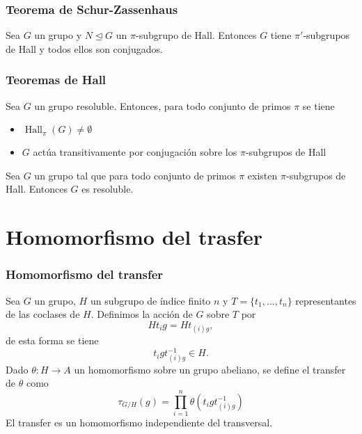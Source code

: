 \documentclass[
	11pt, %
]{beamer}
\DeclareMathOperator{\SylowSubgroup}{Syl}
\DeclareMathOperator{\HallSubgroup}{Hall}
\newcommand{\Syl}[2]{\SylowSubgroup_{#1}(#2)}
\newcommand{\Hall}[2]{\HallSubgroup_{#1}(#2)}
\newcommand{\norm}{\trianglelefteq}
\newcommand{\ord}[1]{\left|#1\right|}%
\newcommand{\homo}[3]{#1\colon #2\to #3}
\newcommand{\extension}[5]{1\xrightarrow{} #3 \xrightarrow{#1} #4\xrightarrow{#2} #5 \xrightarrow{} 1}
\newcommand{\transversal}[2]{\{#1_1,\ldots,#1_#2\}}
\newcommand{\transfer}[2]{\tau_{#1/ #2}}
\begin{document}
\begin{frame}
	\frametitle{Teorema de Schur-Zassenhaus}
	
	\begin{theorem}
		Sea $G$ un grupo y $N\norm G$ un $\pi$-subgrupo de Hall. Entonces $G$ tiene $\pi'$-subgrupos de Hall y todos ellos son conjugados.
	\end{theorem}
	
%	
\end{frame}

\begin{frame}
	\frametitle{Teoremas de Hall}
	
	\begin{theorem}
		Sea $G$ un grupo resoluble. Entonces, para todo conjunto de primos $\pi$ se tiene
		\begin{itemize}
			 \item $\Hall \pi G \neq \emptyset$
			 \item $G$ actúa transitivamente por conjugación sobre los $\pi$-subgrupos de Hall
		\end{itemize}
	\end{theorem}
	\pause
	\begin{theorem}
		Sea $G$ un grupo tal que para todo conjunto de primos $\pi$ existen $\pi$-subgrupos de Hall. Entonces $G$ es resoluble.
	\end{theorem}
	
\end{frame}





\section{Homomorfismo del trasfer}

\begin{frame}
	\frametitle{Homomorfismo del transfer}
	Sea $G$ un grupo, $H$ un subgrupo de índice finito $n$ y $T = \transversal t n$ representantes de las coclases de $H$.
	Definimos la acción de $G$ sobre $T$ por
	$$
		Ht_i g = Ht_{(i)g},
	$$
	\pause
	de esta forma se tiene
	$$
		t_igt_{(i)g}^{-1}\in H.
	$$
	\pause
	Dado $\homo \theta H A$ un homomorfismo sobre un grupo abeliano, se define el transfer de $\theta$ como
	$$
		{\transfer G H}(g) = \prod_{i=1}^n \theta\left(t_igt_{(i)g}^{-1}\right)
	$$
	\pause
	El transfer es un homomorfismo independiente del transversal.
\end{frame}
\end{document}

